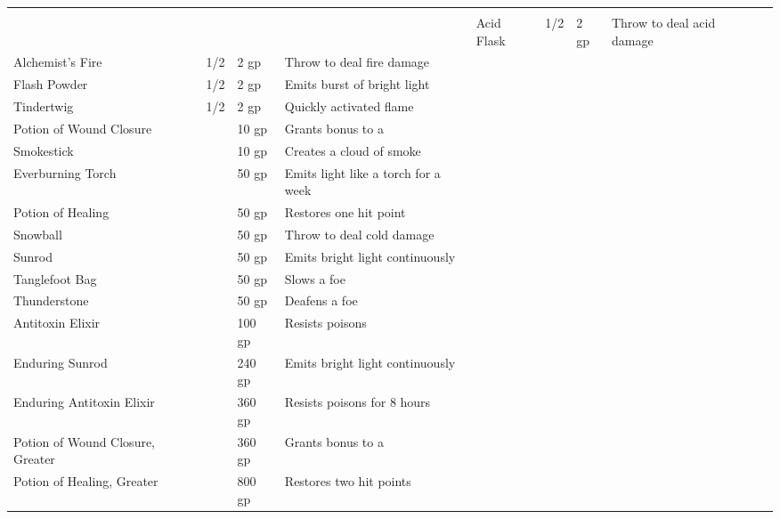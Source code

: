 
\begin{longtablewrapper}
\begin{longtable}{p{15em} p{3em} p{6em} p{25em} p{3em}}

 \\
 &  &  &  &  \tableheaderrule
Acid Flask & 1/2 & 2 gp & Throw to deal acid damage & \pageref{item:Acid Flask} \\
Alchemist's Fire & 1/2 & 2 gp & Throw to deal fire damage & \pageref{item:Alchemist's Fire} \\
Flash Powder & 1/2 & 2 gp & Emits burst of bright light & \pageref{item:Flash Powder} \\
Tindertwig & 1/2 & 2 gp & Quickly activated flame & \pageref{item:Tindertwig} \\
Potion of Wound Closure &  & 10 gp & Grants  bonus to a  & \pageref{item:Potion of Wound Closure} \\
Smokestick &  & 10 gp & Creates a cloud of smoke & \pageref{item:Smokestick} \\
Everburning Torch &  & 50 gp & Emits light like a torch for a week & \pageref{item:Everburning Torch} \\
Potion of Healing &  & 50 gp & Restores one hit point & \pageref{item:Potion of Healing} \\
Snowball &  & 50 gp & Throw to deal cold damage & \pageref{item:Snowball} \\
Sunrod &  & 50 gp & Emits bright light continuously & \pageref{item:Sunrod} \\
Tanglefoot Bag &  & 50 gp & Slows a foe & \pageref{item:Tanglefoot Bag} \\
Thunderstone &  & 50 gp & Deafens a foe & \pageref{item:Thunderstone} \\
Antitoxin Elixir &  & 100 gp & Resists poisons & \pageref{item:Antitoxin Elixir} \\
Enduring Sunrod &  & 240 gp & Emits bright light continuously & \pageref{item:Enduring Sunrod} \\
Enduring Antitoxin Elixir &  & 360 gp & Resists poisons for 8 hours & \pageref{item:Enduring Antitoxin Elixir} \\
Potion of Wound Closure, Greater &  & 360 gp & Grants  bonus to a  & \pageref{item:Potion of Wound Closure, Greater} \\
Potion of Healing, Greater &  & 800 gp & Restores two hit points & \pageref{item:Potion of Healing, Greater} \\

\end{longtable}
\end{longtablewrapper}
